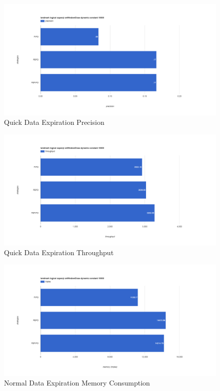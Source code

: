 \begin{figure}[!htbp]
    \centering
    \includegraphics[width=\textwidth]{img/app3-ets-quick-p.png}
    \caption{Quick Data Expiration Precision}
\end{figure}
\begin{figure}[!htbp]
    \centering
    \includegraphics[width=\textwidth]{img/app3-ets-quick-t.png}
    \caption{Quick Data Expiration Throughput}
\end{figure}
\begin{figure}[!htbp]
    \centering
    \includegraphics[width=\textwidth]{img/app3-ets-normal-m.png}
    \caption{Normal Data Expiration Memory Consumption}
\end{figure}
